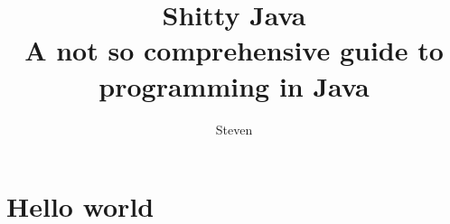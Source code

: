 \documentclass{article}
\begin{document}
\title{Shitty Java \\ {\large A not so comprehensive guide to programming in Java}}
\author{Steven}
\begin{titlepage}
	\maketitle
\end{titlepage}

\tableofcontents
\newpage

\section{Hello world}
\end{document}
